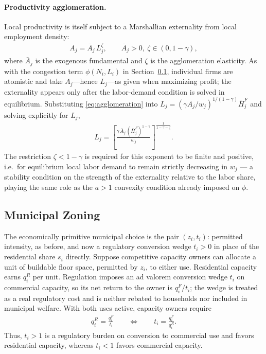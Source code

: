 \documentclass[12pt, a4paper]{article}
\theoremstyle{definition}
\theoremstyle{remark}
\begin{document}
\paragraph{Productivity agglomeration.} Local productivity is itself subject to a Marshallian externality from local employment density:
\begin{align}
    \label{eq:agglomeration}
    A_j = \bar A_j\,L_j^{\zeta}, \qquad \bar A_j>0,\ \zeta\in(0,1-\gamma),
\end{align}
where $\bar A_j$ is the exogenous fundamental and $\zeta$ is the agglomeration elasticity. As with the congestion term $\phi(N_i,L_i)$ in Section~\ref{sec:municipal-zoning}, individual firms are atomistic and take $A_j$---hence $L_j$---as given when maximizing profit; the externality appears only after the labor-demand condition is solved in equilibrium. Substituting \eqref{eq:agglomeration} into $L_j=(\gamma A_j/w_j)^{1/(1-\gamma)}\bar H_j^F$ and solving explicitly for $L_j$,
\begin{align}
    \label{eq:labor-demand-agglom}
    L_j = \left[\frac{\gamma\,\bar A_j\,(\bar H_j^F)^{1-\gamma}}{w_j}\right]^{\frac{1}{1-\gamma-\zeta}}.
\end{align}
The restriction $\zeta<1-\gamma$ is required for this exponent to be finite and positive, i.e.\ for equilibrium local labor demand to remain strictly decreasing in $w_j$ — a stability condition on the strength of the externality relative to the labor share, playing the same role as the $a>1$ convexity condition already imposed on $\phi$.


\subsection{Municipal Zoning}
\label{sec:municipal-zoning}

The economically primitive municipal choice is the pair $(z_i,t_i)$: permitted intensity, as before, and now a regulatory conversion wedge $t_i>0$ in place of the residential share $s_i$ directly. Suppose competitive capacity owners can allocate a unit of buildable floor space, permitted by $z_i$, to either use. Residential capacity earns $q_i^R$ per unit. Regulation imposes an ad valorem conversion wedge $t_i$ on commercial capacity, so its net return to the owner is $q_i^F/t_i$; the wedge is treated as a real regulatory cost and is neither rebated to households nor included in municipal welfare. With both uses active, capacity owners require
\begin{align}
    \label{eq:arbitrage}
    q_i^R=\frac{q_i^F}{t_i}
    \qquad\Longleftrightarrow\qquad
    t_i=\frac{q_i^F}{q_i^R}.
\end{align}
Thus, $t_i>1$ is a regulatory burden on conversion to commercial use and favors residential capacity, whereas $t_i<1$ favors commercial capacity.
\end{document}
